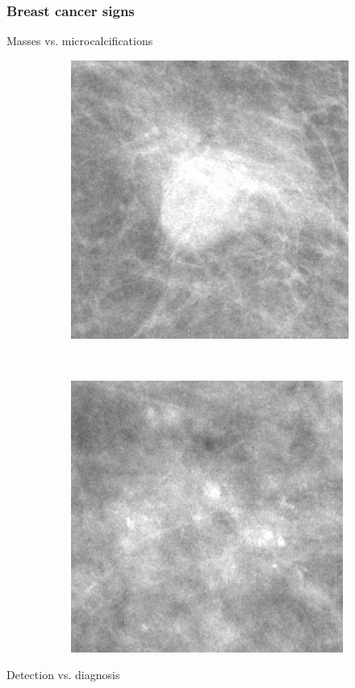 \documentclass{beamer}
\begin{document}
    
	\begin{frame}
		\frametitle{Breast cancer signs}
		Masses vs. microcalcifications
		\begin{figure}[h]
			\centering
			\begin{subfigure}{0.35\textwidth}
				\includegraphics[width=\textwidth]{plots/breastMass.jpg}
			\end{subfigure}
			~
			\begin{subfigure}{0.35\textwidth}
				\includegraphics[width=\textwidth]{plots/breastMicrocalcification.jpg}
			\end{subfigure}
		\end{figure}

		Detection vs. diagnosis
	\end{frame}
	
\end{document}
